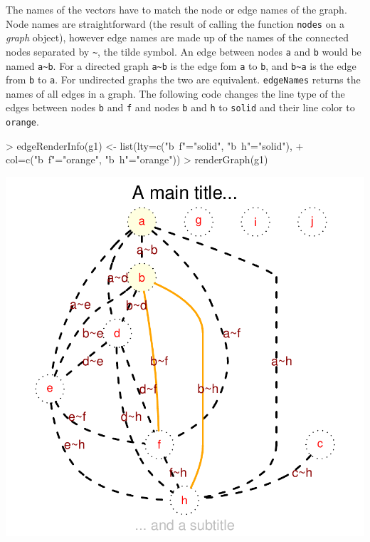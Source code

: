 \documentclass{article}
\newcommand{\Rfunction}[1]{{\texttt{#1}}}
\newcommand{\Robject}[1]{{\texttt{#1}}}
\newcommand{\Rclass}[1]{{\textit{#1}}}
\begin{document}
The names of the vectors have to match the node or edge names of the
graph. Node names are straightforward (the result of calling the
function \Rfunction{nodes} on a \Rclass{graph} object), however edge
names are made up of the names of the connected nodes separated by
\verb+~+, the tilde symbol.  An edge between nodes \verb+a+ and
\verb+b+ would be named \verb+a~b+. For a directed graph \verb+a~b+ is
the edge fom \verb+a+ to \verb+b+, and \verb+b~a+ is the edge from
\verb+b+ to \verb+a+. For undirected graphs the two are
equivalent. \Rfunction{edgeNames} returns the names of all edges in a
graph. The following code changes the line type of the edges between
nodes \verb+b+ and \verb+f+ and nodes \verb+b+ and \verb+h+ to
\Robject{solid} and their line color to \Robject{orange}.

\begin{Schunk}
\begin{Sinput}
> edgeRenderInfo(g1) <- list(lty=c("b~f"="solid", "b~h"="solid"),
+                           col=c("b~f"="orange", "b~h"="orange"))
> renderGraph(g1)
\end{Sinput}
\end{Schunk}
\includegraphics{newRgraphvizInterface-edgePars}
\end{document}
